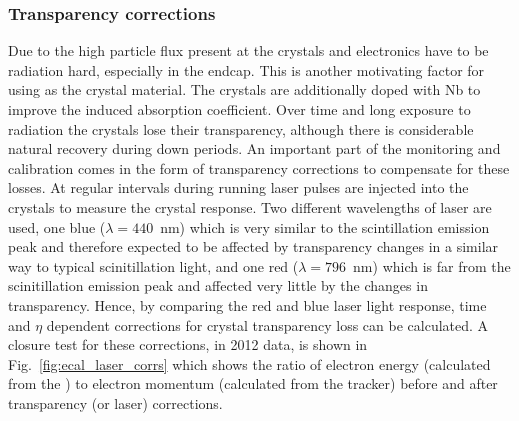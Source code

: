 \subsubsection{Transparency corrections}
Due to the high particle flux present at \CMS the \ECAL crystals and electronics have to be radiation hard, especially in the endcap. This is another motivating factor for using \PbWO as the crystal material. The crystals are additionally doped with Nb to improve the induced absorption coefficient. Over time and long exposure to radiation the crystals lose their transparency, although there is considerable natural recovery during down periods. An important part of the \ECAL monitoring and calibration comes in the form of transparency corrections to compensate for these losses. At regular intervals during \LHC running laser pulses are injected into the crystals to measure the crystal response. Two different wavelengths of laser are used, one blue ($\lambda=440$~nm) which is very similar to the scintillation emission peak and therefore expected to be affected by transparency changes in a similar way to typical scinitillation light, and one red ($\lambda=796$~nm) which is far from the scinitillation emission peak and affected very little by the changes in transparency. Hence, by comparing the red and blue laser light response, time and $\eta$ dependent corrections for crystal transparency loss can be calculated. A closure test for these corrections, in 2012 data, is shown in Fig.~\ref{fig:ecal_laser_corrs} which shows the ratio of electron energy (calculated from the \ECAL) to electron momentum (calculated from the tracker) before and after transparency (or laser) corrections. 
